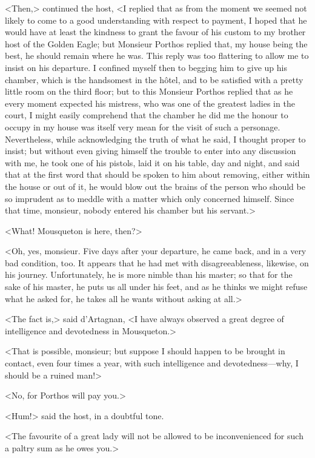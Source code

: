 <Then,> continued the host, <I replied that as from the moment we seemed not likely to come to a good understanding with respect to payment, I hoped that he would have at least the kindness to grant the favour of his custom to my brother host of the Golden Eagle; but Monsieur Porthos replied that, my house being the best, he should remain where he was. This reply was too flattering to allow me to insist on his departure. I confined myself then to begging him to give up his chamber, which is the handsomest in the hôtel, and to be satisfied with a pretty little room on the third floor; but to this Monsieur Porthos replied that as he every moment expected his mistress, who was one of the greatest ladies in the court, I might easily comprehend that the chamber he did me the honour to occupy in my house was itself very mean for the visit of such a personage. Nevertheless, while acknowledging the truth of what he said, I thought proper to insist; but without even giving himself the trouble to enter into any discussion with me, he took one of his pistols, laid it on his table, day and night, and said that at the first word that should be spoken to him about removing, either within the house or out of it, he would blow out the brains of the person who should be so imprudent as to meddle with a matter which only concerned himself. Since that time, monsieur, nobody entered his chamber but his servant.> 

<What! Mousqueton is here, then?> 

<Oh, yes, monsieur. Five days after your departure, he came back, and in a very bad condition, too. It appears that he had met with disagreeableness, likewise, on his journey. Unfortunately, he is more nimble than his master; so that for the sake of his master, he puts us all under his feet, and as he thinks we might refuse what he asked for, he takes all he wants without asking at all.> 

<The fact is,> said d'Artagnan, <I have always observed a great degree of intelligence and devotedness in Mousqueton.> 

<That is possible, monsieur; but suppose I should happen to be brought in contact, even four times a year, with such intelligence and devotedness---why, I should be a ruined man!> 

<No, for Porthos will pay you.> 

<Hum!> said the host, in a doubtful tone. 

<The favourite of a great lady will not be allowed to be inconvenienced for such a paltry sum as he owes you.> 

